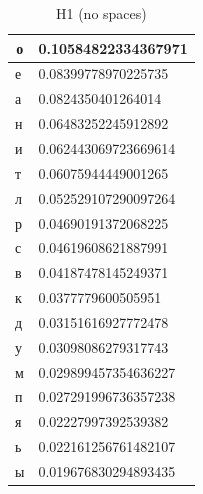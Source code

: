 \begin{table}[]
\centering
\caption{H1 (no spaces)}
\label{tab:my-table}

\begin{tabular}{|l|l|}
\hline
\multicolumn{1}{|c|}{\textbf{о}} & \multicolumn{1}{c|}{\textbf{0.10584822334367971}} \\ \hline
е                                & 0.08399778970225735                               \\ \hline
а                                & 0.0824350401264014                                \\ \hline
н                                & 0.06483252245912892                               \\ \hline
и                                & 0.062443069723669614                              \\ \hline
т                                & 0.06075944449001265                               \\ \hline
л                                & 0.052529107290097264                              \\ \hline
р                                & 0.04690191372068225                               \\ \hline
с                                & 0.04619608621887991                               \\ \hline
в                                & 0.04187478145249371                               \\ \hline
к                                & 0.0377779600505951                                \\ \hline
д                                & 0.03151616927772478                               \\ \hline
у                                & 0.03098086279317743                               \\ \hline
м                                & 0.029899457354636227                              \\ \hline
п                                & 0.027291996736357238                              \\ \hline
я                                & 0.02227997392539382                               \\ \hline
ь                                & 0.022161256761482107                              \\ \hline
ы                                & 0.019676830294893435                              \\ \hline

\end{tabular}
\end{table}

